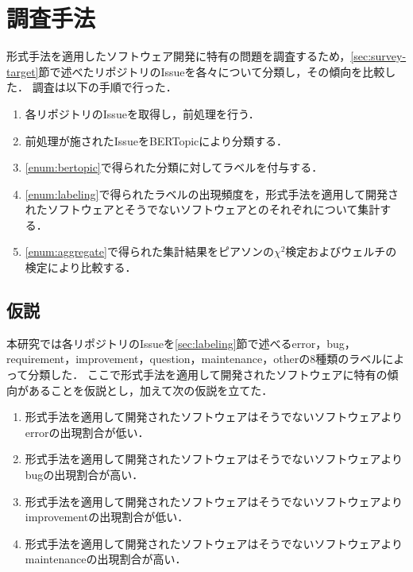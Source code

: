 \documentclass[main]{subfiles}
\begin{document}
\chapter{調査手法}

形式手法を適用したソフトウェア開発に特有の問題を調査するため，\ref{sec:survey-target}節で述べたリポジトリのIssueを各々について分類し，その傾向を比較した．
調査は以下の手順で行った．

\begin{enumerate}[label=手順\arabic*.]
	\item \label{enum:preprocess}
	      各リポジトリのIssueを取得し，前処理を行う．
	\item \label{enum:bertopic}
	      前処理が施されたIssueをBERTopicにより分類する．
	\item \label{enum:labeling}
	      \ref{enum:bertopic}で得られた分類に対してラベルを付与する．
	\item \label{enum:aggregate}
	      \ref{enum:labeling}で得られたラベルの出現頻度を，形式手法を適用して開発されたソフトウェアとそうでないソフトウェアとのそれぞれについて集計する．
	\item \label{enum:statistical}
	      \ref{enum:aggregate}で得られた集計結果をピアソンの\(\chi^2\)検定およびウェルチの検定により比較する．
\end{enumerate}


\section{仮説}
\label{sec:hypothesis}

本研究では各リポジトリのIssueを\ref{sec:labeling}節で述べるerror，bug，requirement，improvement，question，maintenance，otherの8種類のラベルによって分類した．
ここで形式手法を適用して開発されたソフトウェアに特有の傾向があることを仮説とし，加えて次の仮説を立てた．

\begin{enumerate}[label=仮説\arabic*.]
	\item \label{hyp:1} 形式手法を適用して開発されたソフトウェアはそうでないソフトウェアよりerrorの出現割合が低い．
	\item \label{hyp:2} 形式手法を適用して開発されたソフトウェアはそうでないソフトウェアよりbugの出現割合が高い．
	\item \label{hyp:3} 形式手法を適用して開発されたソフトウェアはそうでないソフトウェアよりimprovementの出現割合が低い．
	\item \label{hyp:4} 形式手法を適用して開発されたソフトウェアはそうでないソフトウェアよりmaintenanceの出現割合が高い．
\end{enumerate}
\end{document}
